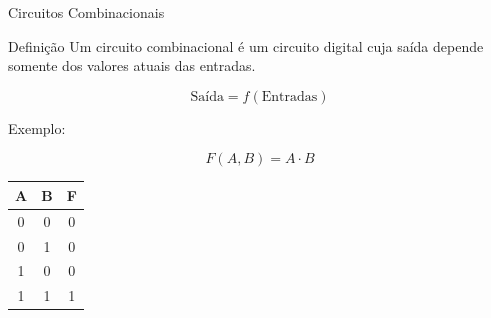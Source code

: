 
\begin{frame}{Circuitos Combinacionais}

    \begin{block}{Definição}
        Um circuito combinacional é um circuito digital cuja saída depende
        somente dos valores atuais das entradas.
    \end{block}

    \[
        \boxed{\text{Saída} = f(\text{Entradas})}
    \]

    Exemplo:

    \[
        F(A,B)=A\cdot B
    \]

    \begin{center}
        \begin{tabular}{c c | c}
            \hline
            A & B & F \\
            \hline
            0 & 0 & 0 \\
            0 & 1 & 0 \\
            1 & 0 & 0 \\
            1 & 1 & 1 \\
            \hline
        \end{tabular}
    \end{center}

\end{frame}